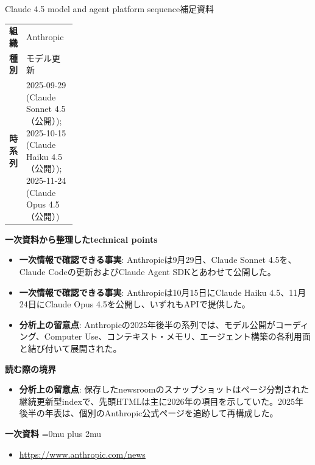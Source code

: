 \begin{technicalnote}{Claude 4.5 model and agent platform sequence}{補足資料}
\begingroup
\begin{tabularx}{\linewidth}{@{}>{\bfseries}p{0.22\linewidth}X@{}}
組織 & Anthropic \\
種別 & モデル更新 \\
時系列 & 2025-09-29 (Claude Sonnet 4.5（公開）); 2025-10-15 (Claude Haiku 4.5（公開）); 2025-11-24 (Claude Opus 4.5（公開）) \\
\end{tabularx}
\smallskip
{\bfseries 一次資料から整理したtechnical points}
\begin{itemize}[leftmargin=1.5em,itemsep=0.35em]
\item \textbf{一次情報で確認できる事実}: Anthropicは9月29日、Claude Sonnet 4.5を、Claude Codeの更新およびClaude Agent SDKとあわせて公開した。
\item \textbf{一次情報で確認できる事実}: Anthropicは10月15日にClaude Haiku 4.5、11月24日にClaude Opus 4.5を公開し、いずれもAPIで提供した。
\item \textbf{分析上の留意点}: Anthropicの2025年後半の系列では、モデル公開がコーディング、Computer Use、コンテキスト・メモリ、エージェント構築の各利用面と結び付いて展開された。
\end{itemize}
\begin{minipage}{\linewidth}
{\bfseries 読む際の境界}
\begin{itemize}[leftmargin=1.5em,itemsep=0.35em]
\item \textbf{分析上の留意点}: 保存したnewsroomのスナップショットはページ分割された継続更新型indexで、先頭HTMLは主に2026年の項目を示していた。2025年後半の年表は、個別のAnthropic公式ページを追跡して再構成した。
\end{itemize}
\begin{samepage}
{\bfseries 一次資料}
\begingroup\sloppy
\Urlmuskip=0mu plus 2mu\relax
\begin{itemize}[leftmargin=1.5em,itemsep=0.25em]
\item {\scriptsize\url{https://www.anthropic.com/news}}
\end{itemize}
\endgroup
\end{samepage}
\end{minipage}
\endgroup
\end{technicalnote}
\medskip

